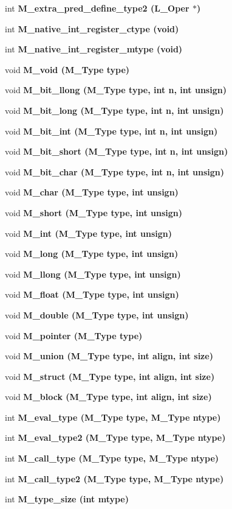 \begin{CompactItemize}
int \bf{M\_\-extra\_\-pred\_\-define\_\-type2} (L\_\-Oper $\ast$)
\item 
int \bf{M\_\-native\_\-int\_\-register\_\-ctype} (void)
\item 
int \bf{M\_\-native\_\-int\_\-register\_\-mtype} (void)
\item 
void \bf{M\_\-void} (\bf{M\_\-Type} type)
\item 
void \bf{M\_\-bit\_\-llong} (\bf{M\_\-Type} type, int n, int unsign)
\item 
void \bf{M\_\-bit\_\-long} (\bf{M\_\-Type} type, int n, int unsign)
\item 
void \bf{M\_\-bit\_\-int} (\bf{M\_\-Type} type, int n, int unsign)
\item 
void \bf{M\_\-bit\_\-short} (\bf{M\_\-Type} type, int n, int unsign)
\item 
void \bf{M\_\-bit\_\-char} (\bf{M\_\-Type} type, int n, int unsign)
\item 
void \bf{M\_\-char} (\bf{M\_\-Type} type, int unsign)
\item 
void \bf{M\_\-short} (\bf{M\_\-Type} type, int unsign)
\item 
void \bf{M\_\-int} (\bf{M\_\-Type} type, int unsign)
\item 
void \bf{M\_\-long} (\bf{M\_\-Type} type, int unsign)
\item 
void \bf{M\_\-llong} (\bf{M\_\-Type} type, int unsign)
\item 
void \bf{M\_\-float} (\bf{M\_\-Type} type, int unsign)
\item 
void \bf{M\_\-double} (\bf{M\_\-Type} type, int unsign)
\item 
void \bf{M\_\-pointer} (\bf{M\_\-Type} type)
\item 
void \bf{M\_\-union} (\bf{M\_\-Type} type, int align, int size)
\item 
void \bf{M\_\-struct} (\bf{M\_\-Type} type, int align, int size)
\item 
void \bf{M\_\-block} (\bf{M\_\-Type} type, int align, int size)
\item 
int \bf{M\_\-eval\_\-type} (\bf{M\_\-Type} type, \bf{M\_\-Type} ntype)
\item 
int \bf{M\_\-eval\_\-type2} (\bf{M\_\-Type} type, \bf{M\_\-Type} ntype)
\item 
int \bf{M\_\-call\_\-type} (\bf{M\_\-Type} type, \bf{M\_\-Type} ntype)
\item 
int \bf{M\_\-call\_\-type2} (\bf{M\_\-Type} type, \bf{M\_\-Type} ntype)
\item 
int \bf{M\_\-type\_\-size} (int mtype)

\end{CompactItemize}
